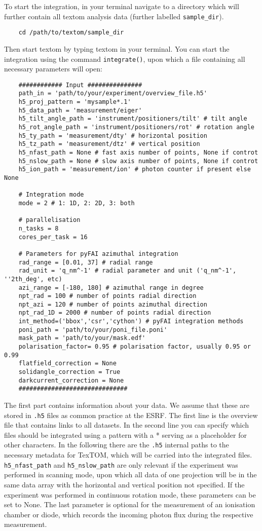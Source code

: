 To start the integration, in your terminal navigate to a directory which will further contain all 
textom analysis data (further labelled \texttt{sample\_dir}).
\begin{verbatim}
    cd /path/to/textom/sample_dir
\end{verbatim}
Then start textom by typing textom in your terminal.
You can start the integration using the command \texttt{integrate()}, upon which a file containing all necessary
parameters will open:
\begin{verbatim}
    ############ Input ###############
    path_in = 'path/to/your/experiment/overview_file.h5'
    h5_proj_pattern = 'mysample*.1'
    h5_data_path = 'measurement/eiger'
    h5_tilt_angle_path = 'instrument/positioners/tilt' # tilt angle
    h5_rot_angle_path = 'instrument/positioners/rot' # rotation angle
    h5_ty_path = 'measurement/dty' # horizontal position
    h5_tz_path = 'measurement/dtz' # vertical position
    h5_nfast_path = None # fast axis number of points, None if controt
    h5_nslow_path = None # slow axis number of points, None if controt
    h5_ion_path = 'measurement/ion' # photon counter if present else None
    
    # Integration mode
    mode = 2 # 1: 1D, 2: 2D, 3: both
    
    # parallelisation
    n_tasks = 8
    cores_per_task = 16
    
    # Parameters for pyFAI azimuthal integration
    rad_range = [0.01, 37] # radial range
    rad_unit = 'q_nm^-1' # radial parameter and unit ('q_nm^-1', ''2th_deg', etc)
    azi_range = [-180, 180] # azimuthal range in degree
    npt_rad = 100 # number of points radial direction
    npt_azi = 120 # number of points azimuthal direction
    npt_rad_1D = 2000 # number of points radial direction
    int_method=('bbox','csr','cython') # pyFAI integration methods
    poni_path = 'path/to/your/poni_file.poni'
    mask_path = 'path/to/your/mask.edf'
    polarisation_factor= 0.95 # polarisation factor, usually 0.95 or 0.99
    flatfield_correction = None
    solidangle_correction = True
    darkcurrent_correction = None
    ##############################
\end{verbatim}
The first part contains information about your data. We assume that these are stored in \texttt{.h5} files as common practice
at the ESRF. The first line is the overview file that contains links to all datasets. In the second line you can
specify which files should be integrated using a pattern with a * serving as a placeholder for other characters.
In the following there are the \texttt{.h5} internal paths to the necessary metadata for TexTOM, which will be carried into the
integrated files. \texttt{h5\_nfast\_path} and \texttt{h5\_nslow\_path} are only relevant if the experiment was performed in scanning mode,
upon which all data of one projection will be in the same data array with the horizontal and vertical position not specified.
If the experiment was performed in continuous rotation mode, these parameters can be set to None.
The last parameter is optional for the measurement of an ionisation chamber or diode, which records the incoming photon
flux during the respective measurement.

